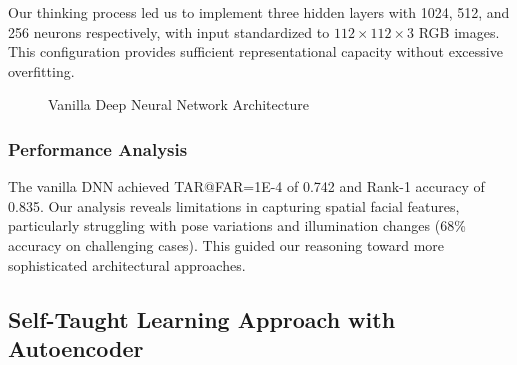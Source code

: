 \documentclass[11pt]{article}
\begin{document}
Our thinking process led us to implement three hidden layers with 1024, 512, and 256 neurons respectively, with input standardized to $112 \times 112 \times 3$ RGB images. This configuration provides sufficient representational capacity without excessive overfitting.

\begin{figure}[htbp]
\centering
{}
\caption{Vanilla Deep Neural Network Architecture}
\label{fig:vanilla_dnn}
\end{figure}

\subsubsection{Performance Analysis}

The vanilla DNN achieved TAR@FAR=1E-4 of 0.742 and Rank-1 accuracy of 0.835. Our analysis reveals limitations in capturing spatial facial features, particularly struggling with pose variations and illumination changes (68\% accuracy on challenging cases). This guided our reasoning toward more sophisticated architectural approaches.

\subsection{Self-Taught Learning Approach with Autoencoder}
\end{document}
